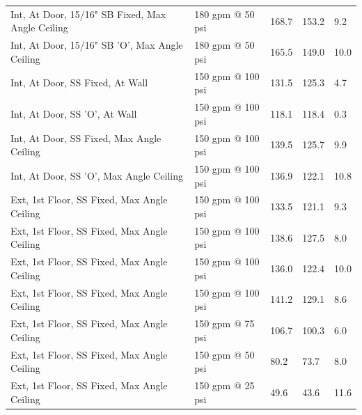 \documentclass[12pt,oneside]{book}
\begin{document}
\begin{table}[!ht]
\begin{tabular}{lllll}
Int, At Door, 15/16" SB Fixed, Max Angle Ceiling      & 180 gpm @ 50 psi               & 168.7                             & 153.2                              & 9.2                    \\
Int, At Door, 15/16" SB 'O', Max Angle Ceiling        & 180 gpm @ 50 psi               & 165.5                             & 149.0                              & 10.0                   \\
Int, At Door, SS Fixed, At Wall                       & 150 gpm @ 100 psi              & 131.5                             & 125.3                              & 4.7                    \\
Int, At Door, SS 'O', At Wall                         & 150 gpm @ 100 psi              & 118.1                             & 118.4                              & 0.3                    \\
Int, At Door, SS Fixed, Max Angle Ceiling             & 150 gpm @ 100 psi              & 139.5                             & 125.7                              & 9.9                    \\
Int, At Door, SS 'O', Max Angle Ceiling               & 150 gpm @ 100 psi              & 136.9                             & 122.1                              & 10.8                   \\
Ext, 1st Floor, SS Fixed, Max Angle Ceiling           & 150 gpm @ 100 psi              & 133.5                             & 121.1                              & 9.3                    \\
Ext, 1st Floor, SS Fixed, Max Angle Ceiling           & 150 gpm @ 100 psi              & 138.6                             & 127.5                              & 8.0                    \\
Ext, 1st Floor, SS Fixed, Max Angle Ceiling           & 150 gpm @ 100 psi              & 136.0                             & 122.4                              & 10.0                   \\
Ext, 1st Floor, SS Fixed, Max Angle Ceiling           & 150 gpm @ 100 psi              & 141.2                             & 129.1                              & 8.6                    \\
Ext, 1st Floor, SS Fixed, Max Angle Ceiling           & 150 gpm @ 75 psi               & 106.7                             & 100.3                              & 6.0                    \\
Ext, 1st Floor, SS Fixed, Max Angle Ceiling           & 150 gpm @ 50 psi               &  80.2                             & 73.7                               & 8.0                    \\
Ext, 1st Floor, SS Fixed, Max Angle Ceiling           & 150 gpm @ 25 psi               &  49.6                             & 43.6                               & 11.6                   \\                   
\bottomrule[1.25pt]
\end{tabular}
\end{table}
\end{document}
